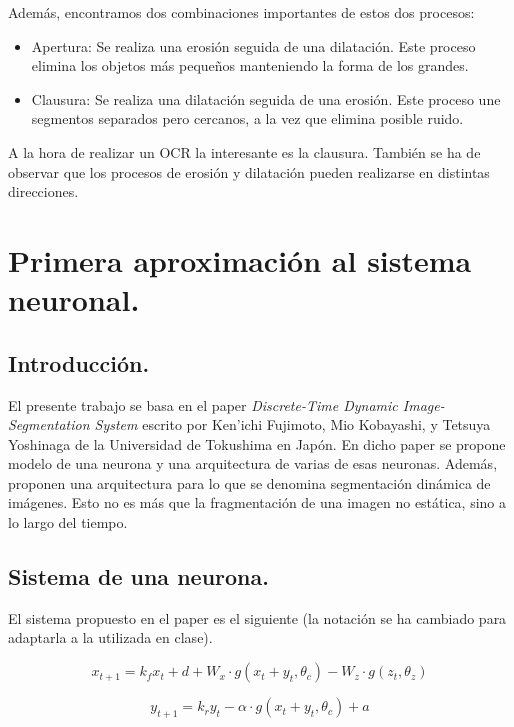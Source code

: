 \documentclass[11pt]{amsart}
\begin{document}
Adem\'as, encontramos dos combinaciones importantes de estos dos procesos:\\

\begin{itemize}
\item Apertura: Se realiza una erosi\'on seguida de una dilataci\'on. Este proceso elimina los objetos m\'as
peque\~nos manteniendo la forma de los grandes.
\item Clausura: Se realiza una dilataci\'on seguida de una erosi\'on. Este proceso une segmentos separados pero
cercanos, a la vez que elimina posible ruido.
\end{itemize}

A la hora de realizar un OCR la interesante es la clausura. Tambi\'en se ha de observar que los procesos de
erosi\'on y dilataci\'on pueden realizarse en distintas direcciones.\\

\section{Primera aproximaci\'on al sistema neuronal.}

\subsection{Introducci\'on.}

El presente trabajo se basa en el paper \emph{Discrete-Time Dynamic Image-Segmentation System} escrito por Ken'ichi
Fujimoto, Mio Kobayashi, y Tetsuya Yoshinaga de la Universidad de Tokushima en Jap\'on. En dicho paper se propone
modelo de una neurona y una arquitectura de varias de esas neuronas. Adem\'as, proponen una arquitectura para
lo que se denomina segmentaci\'on din\'amica de im\'agenes. Esto no es m\'as que la fragmentaci\'on de una imagen
no est\'atica, sino a lo largo del tiempo.\\

\subsection{Sistema de una neurona.}

El sistema propuesto en el paper es el siguiente (la notaci\'on se ha cambiado para adaptarla a la utilizada
en clase).

$$
x_{t+1}=k_{f}x_{t}+d+W_{x}\cdot g(x_{t}+y_{t},\theta_{c})-W_{z}\cdot g(z_{t},\theta_{z})
$$

$$
y_{t+1}=k_{r}y_{t}-\alpha\cdot g(x_{t}+y_{t},\theta_{c}) + a
$$
\end{document}
